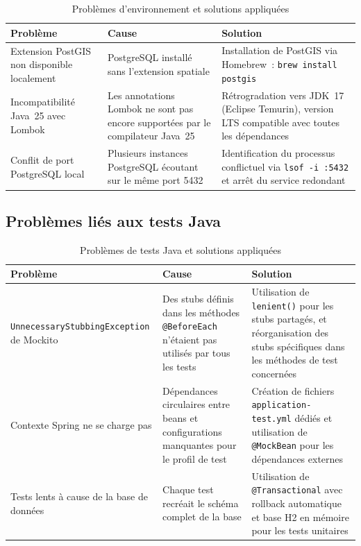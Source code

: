 \begin{table}[H]
\centering
\caption{Probl\`{e}mes d'environnement et solutions appliqu\'{e}es}
\label{tab:problemes-env}
\begin{tabularx}{\textwidth}{|X|X|X|}
\hline
\rowcolor{speedlineBlue!10}
\textbf{Probl\`{e}me} & \textbf{Cause} & \textbf{Solution} \\
\hline
Extension PostGIS non disponible localement &
PostgreSQL install\'{e} sans l'extension spatiale &
Installation de PostGIS via Homebrew~:
\texttt{brew install postgis} \\
\hline
Incompatibilit\'{e} Java~25 avec Lombok &
Les annotations Lombok ne sont pas encore support\'{e}es par le
compilateur Java~25 &
R\'{e}trogradation vers JDK~17 (Eclipse Temurin), version LTS
compatible avec toutes les d\'{e}pendances \\
\hline
Conflit de port PostgreSQL local &
Plusieurs instances PostgreSQL \'{e}coutant sur le m\^{e}me port 5432 &
Identification du processus conflictuel via \texttt{lsof -i :5432}
et arr\^{e}t du service redondant \\
\hline
\end{tabularx}
\end{table}

\subsection{Probl\`{e}mes li\'{e}s aux tests Java}

\begin{table}[H]
\centering
\caption{Probl\`{e}mes de tests Java et solutions appliqu\'{e}es}
\label{tab:problemes-java}
\begin{tabularx}{\textwidth}{|X|X|X|}
\hline
\rowcolor{speedlineBlue!10}
\textbf{Probl\`{e}me} & \textbf{Cause} & \textbf{Solution} \\
\hline
\texttt{UnnecessaryStubbingException} de Mockito &
Des stubs d\'{e}finis dans les m\'{e}thodes \texttt{@BeforeEach} n'\'{e}taient
pas utilis\'{e}s par tous les tests &
Utilisation de \texttt{lenient()} pour les stubs partag\'{e}s, et
r\'{e}organisation des stubs sp\'{e}cifiques dans les m\'{e}thodes de test
concern\'{e}es \\
\hline
Contexte Spring ne se charge pas &
D\'{e}pendances circulaires entre beans et configurations
manquantes pour le profil de test &
Cr\'{e}ation de fichiers \texttt{application-test.yml} d\'{e}di\'{e}s et
utilisation de \texttt{@MockBean} pour les d\'{e}pendances externes \\
\hline
Tests lents \`{a} cause de la base de donn\'{e}es &
Chaque test recr\'{e}ait le sch\'{e}ma complet de la base &
Utilisation de \texttt{@Transactional} avec rollback automatique
et base H2 en m\'{e}moire pour les tests unitaires \\
\hline
\end{tabularx}
\end{table}


